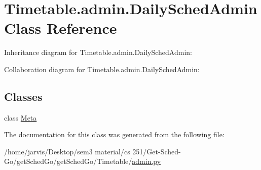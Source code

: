 \hypertarget{classTimetable_1_1admin_1_1DailySchedAdmin}{}\section{Timetable.\+admin.\+Daily\+Sched\+Admin Class Reference}
\label{classTimetable_1_1admin_1_1DailySchedAdmin}


Inheritance diagram for Timetable.\+admin.\+Daily\+Sched\+Admin\+:


Collaboration diagram for Timetable.\+admin.\+Daily\+Sched\+Admin\+:
\subsection*{Classes}
\begin{DoxyCompactItemize}
\item 
class \hyperlink{classTimetable_1_1admin_1_1DailySchedAdmin_1_1Meta}{Meta}
\end{DoxyCompactItemize}


The documentation for this class was generated from the following file\+:\begin{DoxyCompactItemize}
\item 
/home/jarvis/\+Desktop/sem3 material/cs 251/\+Get-\/\+Sched-\/\+Go/get\+Sched\+Go/get\+Sched\+Go/\+Timetable/\hyperlink{Timetable_2admin_8py}{admin.\+py}\end{DoxyCompactItemize}
